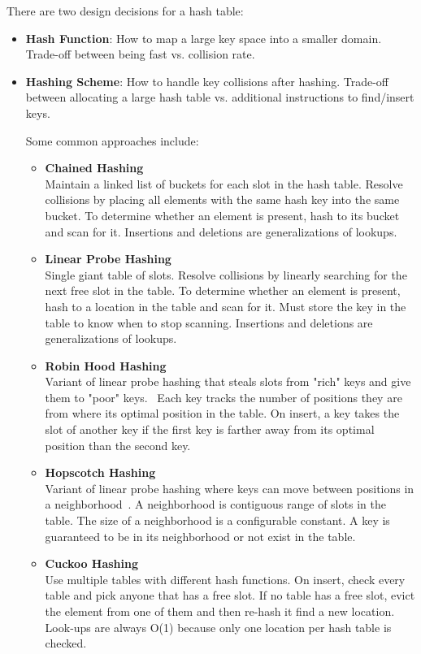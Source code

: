 \documentclass[11pt]{article}
\begin{document}
There are two design decisions for a hash table:
\begin{itemize}
	\item \textbf{Hash Function}:
	How to map a large key space into a smaller domain.
	Trade-off between being fast vs. collision rate.
	
	\item \textbf{Hashing Scheme}:
	How to handle key collisions after hashing.
	Trade-off between allocating a large hash table vs. additional instructions to find/insert keys.
	
	Some common approaches include:
	\begin{itemize}
		\item \textbf{Chained Hashing}\\
		Maintain a linked list of buckets for each slot in the hash table.
		Resolve collisions by placing all elements with the same hash key into the same bucket.
		To determine whether an element is present, hash to its bucket and scan for it.
		Insertions and deletions are generalizations of lookups.
		
		\item \textbf{Linear Probe Hashing}\\
		Single giant table of slots.
		Resolve collisions by linearly searching for the next free slot in the table.
		To determine whether an element is present, hash to a location in the table and scan for it.
		Must store the key in the table to know when to stop scanning.
		Insertions and deletions are generalizations of lookups.
		
		\item \textbf{Robin Hood Hashing}\\
		Variant of linear probe hashing that steals slots from "rich" keys and give them to "poor" keys.~\cite{Celis1985}
		Each key tracks the number of positions they are from where its optimal position in the table.
		On insert, a key takes the slot of another key if the first key is farther away from its optimal position than the second key.
		
		\item \textbf{Hopscotch Hashing}\\
		Variant of linear probe hashing where keys can move between positions in a neighborhood~\cite{Herlihy2008}.
		A neighborhood is contiguous range of slots in the table.
		The size of a neighborhood is a configurable constant.
		A key is guaranteed to be in its neighborhood or not exist in the table.
		
		\item \textbf{Cuckoo Hashing}\\
		Use multiple tables with different hash functions.
		On insert, check every table and pick anyone that has a free slot.
		If no table has a free slot, evict the element from one of them and then re-hash it find a new location.
		Look-ups are always O(1) because only one location per hash table is checked.
		

\end{itemize}
\end{itemize}
\end{document}
